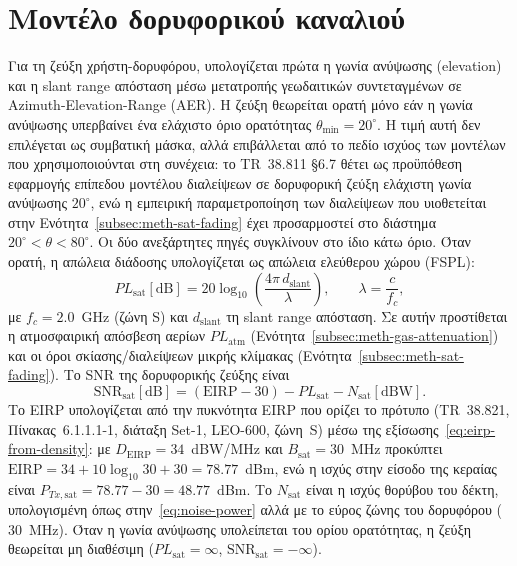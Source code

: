\section{Μοντέλο δορυφορικού καναλιού}
\label{sec:meth-sat-channel}

Για τη ζεύξη χρήστη-δορυφόρου, υπολογίζεται πρώτα η γωνία ανύψωσης
(elevation) και η slant range απόσταση μέσω μετατροπής γεωδαιτικών
συντεταγμένων σε Azimuth-Elevation-Range (AER). Η ζεύξη θεωρείται ορατή
μόνο εάν η γωνία ανύψωσης υπερβαίνει ένα ελάχιστο όριο ορατότητας
$\theta_{\min} = 20^\circ$. Η τιμή αυτή δεν επιλέγεται ως συμβατική μάσκα,
αλλά επιβάλλεται από το πεδίο ισχύος των μοντέλων που χρησιμοποιούνται στη
συνέχεια: το TR~38.811 §6.7 θέτει ως προϋπόθεση εφαρμογής επίπεδου
μοντέλου διαλείψεων σε δορυφορική ζεύξη ελάχιστη γωνία ανύψωσης
$20^\circ$, ενώ η εμπειρική παραμετροποίηση των διαλείψεων που υιοθετείται
στην Ενότητα~\ref{subsec:meth-sat-fading} έχει προσαρμοστεί στο διάστημα
$20^\circ < \theta < 80^\circ$. Οι δύο ανεξάρτητες πηγές συγκλίνουν στο
ίδιο κάτω όριο. Όταν ορατή, η απώλεια διάδοσης υπολογίζεται ως
απώλεια ελεύθερου χώρου (FSPL):
\begin{equation}
PL_{\text{sat}}[\text{dB}] = 20\log_{10}\!\left(\frac{4\pi \, d_{\text{slant}}}{\lambda}\right),
\qquad \lambda = \frac{c}{f_c},
\label{eq:fspl}
\end{equation}
με $f_c = 2.0$~GHz (ζώνη S) και $d_{\text{slant}}$ τη slant range
απόσταση. Σε αυτήν προστίθεται η ατμοσφαιρική απόσβεση αερίων
$PL_{\text{atm}}$ (Ενότητα~\ref{subsec:meth-gas-attenuation}) και οι
όροι σκίασης/διαλείψεων μικρής κλίμακας
(Ενότητα~\ref{subsec:meth-sat-fading}). Το SNR της δορυφορικής ζεύξης
είναι
\begin{equation}
\text{SNR}_{\text{sat}}[\text{dB}] = (\text{EIRP} - 30) - PL_{\text{sat}} - N_{\text{sat}}[\text{dBW}].
\label{eq:snr-sat}
\end{equation}
Το EIRP υπολογίζεται από την πυκνότητα EIRP που ορίζει το πρότυπο
(TR~38.821, Πίνακας~6.1.1.1-1, διάταξη Set-1, LEO-600, ζώνη~S) μέσω της
εξίσωσης~\eqref{eq:eirp-from-density}: με $D_{\text{EIRP}} = 34$~dBW/MHz
και $B_{\text{sat}} = 30$~MHz προκύπτει $\text{EIRP} = 34 + 10\log_{10}30
+ 30 = 78.77$~dBm, ενώ η ισχύς στην είσοδο της κεραίας είναι
$P_{Tx,\text{sat}} = 78.77 - 30 = 48.77$~dBm. Το $N_{\text{sat}}$ είναι η
ισχύς θορύβου του δέκτη, υπολογισμένη όπως στην~\eqref{eq:noise-power}
αλλά με το εύρος ζώνης του δορυφόρου ($30$~MHz). Όταν η γωνία ανύψωσης
υπολείπεται του ορίου ορατότητας, η ζεύξη θεωρείται μη διαθέσιμη
($PL_{\text{sat}} = \infty$, $\text{SNR}_{\text{sat}} = -\infty$).

